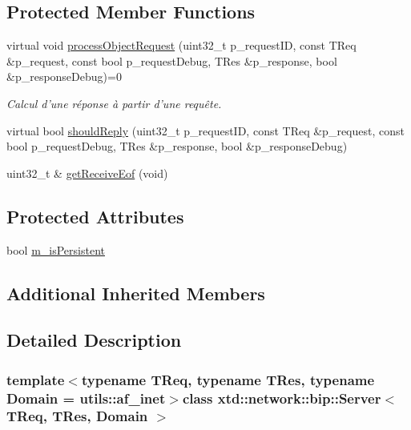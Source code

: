\subsection*{Protected Member Functions}
\begin{DoxyCompactItemize}
\item 
virtual void \hyperlink{classxtd_1_1network_1_1bip_1_1Server_ab50170b42e25b207fb0af9f4d47a3430}{process\-Object\-Request} (uint32\-\_\-t p\-\_\-request\-I\-D, const T\-Req \&p\-\_\-request, const bool p\-\_\-request\-Debug, T\-Res \&p\-\_\-response, bool \&p\-\_\-response\-Debug)=0
\begin{DoxyCompactList}\small\item\em Calcul d'une réponse à partir d'une requête. \end{DoxyCompactList}\item 
virtual bool \hyperlink{classxtd_1_1network_1_1bip_1_1Server_a81b22d0e5ce1b5f8f6cfbe8618f09cad}{should\-Reply} (uint32\-\_\-t p\-\_\-request\-I\-D, const T\-Req \&p\-\_\-request, const bool p\-\_\-request\-Debug, T\-Res \&p\-\_\-response, bool \&p\-\_\-response\-Debug)
\item 
uint32\-\_\-t \& \hyperlink{classxtd_1_1network_1_1bip_1_1Server_aaeacc82ce89563b36e863ba4bbab2470}{get\-Receive\-Eof} (void)
\end{DoxyCompactItemize}
\subsection*{Protected Attributes}
\begin{DoxyCompactItemize}
\item 
bool \hyperlink{classxtd_1_1network_1_1bip_1_1Server_ae9efbc2f358222636d3134bf8973f906}{m\-\_\-is\-Persistent}
\end{DoxyCompactItemize}
\subsection*{Additional Inherited Members}


\subsection{Detailed Description}
\subsubsection*{template$<$typename T\-Req, typename T\-Res, typename Domain = utils\-::af\-\_\-inet$>$class xtd\-::network\-::bip\-::\-Server$<$ T\-Req, T\-Res, Domain $>$}


